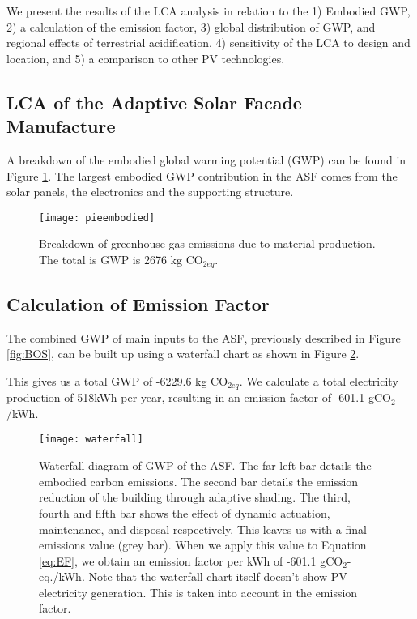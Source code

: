 
We present the results of the LCA analysis in relation to the 1) Embodied GWP, 2) a calculation of the emission factor, 3) global distribution of GWP, and regional effects of terrestrial acidification, 4) sensitivity of the LCA to design and location, and 5) a comparison to other PV technologies.

\subsection{LCA of the Adaptive Solar Facade Manufacture}

A breakdown of the embodied global warming potential (GWP) can be found in Figure  \ref{fig:embodied}. The largest embodied GWP contribution in the ASF comes from the solar panels, the electronics and the supporting structure.

\begin{figure}[H]
\begin{center}
\texttt{[image: pieembodied]}
\caption{Breakdown of greenhouse gas emissions due to material production. The total is GWP is 2676 kg CO$_{2eq}$.}
\label{fig:embodied}
\end{center}
\end{figure}

\subsection{Calculation of Emission Factor}
The combined GWP of main inputs to the ASF, previously described in Figure \ref{fig:BOS}, can be built up using a waterfall chart as shown in Figure \ref{fig:waterfall}. 

This gives us a total GWP of -6229.6 kg CO$_{2eq}$. We calculate a total electricity production of 518kWh per year, resulting in an emission factor of -601.1 gCO${_2}$/kWh.

\begin{figure}[H]
\begin{center}
\texttt{[image: waterfall]}
\caption{Waterfall diagram of GWP of the ASF. The far left bar details the embodied carbon emissions. The second bar details the emission reduction of the building through adaptive shading. The third, fourth and fifth bar shows the effect of dynamic actuation, maintenance, and disposal respectively. This leaves us with a final emissions value (grey bar). When we apply this value to Equation \ref{eq:EF}, we obtain an emission factor per kWh of -601.1 gCO$_2$-eq./kWh. Note that the waterfall chart itself doesn't show PV electricity generation. This is taken into account in the emission factor.}

\label{fig:waterfall}
\end{center}
\end{figure}

